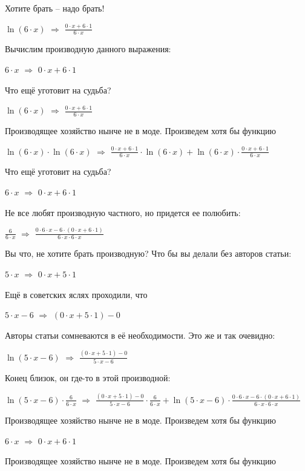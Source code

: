 \documentclass{article}
\begin{document}
Хотите брать -- надо брать!

$ \ln (6 \cdot x)$ $\Rightarrow$ $\frac{0 \cdot x + 6 \cdot 1}{6 \cdot x}$

Вычислим производную данного выражения:

$6 \cdot x$ $\Rightarrow$ $0 \cdot x + 6 \cdot 1$

Что ещё уготовит на судьба?

$ \ln (6 \cdot x)$ $\Rightarrow$ $\frac{0 \cdot x + 6 \cdot 1}{6 \cdot x}$

Производящее хозяйство нынче не в моде. Произведем хотя бы функцию

$ \ln (6 \cdot x) \cdot  \ln (6 \cdot x)$ $\Rightarrow$ $\frac{0 \cdot x + 6 \cdot 1}{6 \cdot x} \cdot  \ln (6 \cdot x) +  \ln (6 \cdot x) \cdot \frac{0 \cdot x + 6 \cdot 1}{6 \cdot x}$

Что ещё уготовит на судьба?

$6 \cdot x$ $\Rightarrow$ $0 \cdot x + 6 \cdot 1$

Не все любят производную частного, но придется ее полюбить:

$\frac{6}{6 \cdot x}$ $\Rightarrow$ $\frac{0 \cdot 6 \cdot x - 6 \cdot (0 \cdot x + 6 \cdot 1)}{6 \cdot x \cdot 6 \cdot x}$

Вы что, не хотите брать производную? Что бы вы делали без авторов статьи:

$5 \cdot x$ $\Rightarrow$ $0 \cdot x + 5 \cdot 1$

Ещё в советских яслях проходили, что

$5 \cdot x - 6$ $\Rightarrow$ $(0 \cdot x + 5 \cdot 1) - 0$

Авторы статьи сомневаются в её необходимости. Это же и так очевидно:

$ \ln (5 \cdot x - 6)$ $\Rightarrow$ $\frac{(0 \cdot x + 5 \cdot 1) - 0}{5 \cdot x - 6}$

Конец близок, он где-то в этой производной:

$ \ln (5 \cdot x - 6) \cdot \frac{6}{6 \cdot x}$ $\Rightarrow$ $\frac{(0 \cdot x + 5 \cdot 1) - 0}{5 \cdot x - 6} \cdot \frac{6}{6 \cdot x} +  \ln (5 \cdot x - 6) \cdot \frac{0 \cdot 6 \cdot x - 6 \cdot (0 \cdot x + 6 \cdot 1)}{6 \cdot x \cdot 6 \cdot x}$

Производящее хозяйство нынче не в моде. Произведем хотя бы функцию

$6 \cdot x$ $\Rightarrow$ $0 \cdot x + 6 \cdot 1$

Производящее хозяйство нынче не в моде. Произведем хотя бы функцию
\end{document}
